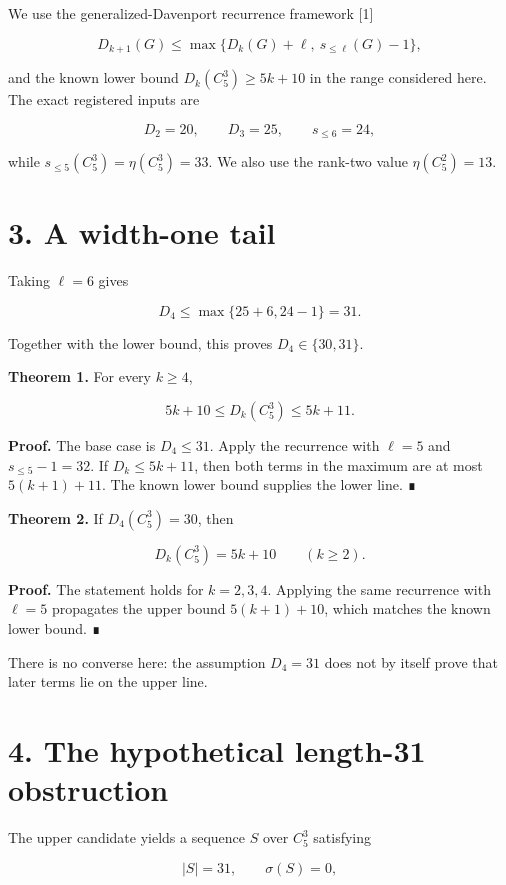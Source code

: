 \documentclass[
  11pt,
]{article}
\begin{document}
We use the generalized-Davenport recurrence framework {[}1{]}

\[
D_{k+1}(G)
\le\max\{D_k(G)+\ell, \ s_{\le\ell}(G)-1\},
\]

and the known lower bound \(D_k(C_5^3)\ge5k+10\) in the range considered
here. The exact registered inputs are

\[
D_2=20, \qquad D_3=25, \qquad s_{\le6}=24,
\]

while \(s_{\le5}(C_5^3)=\eta(C_5^3)=33\). We also use the rank-two value
\(\eta(C_5^2)=13\).

\hypertarget{a-width-one-tail}{%
\section{3. A width-one tail}\label{a-width-one-tail}}

Taking \(\ell=6\) gives

\[
D_4\le\max\{25+6,24-1\}=31.
\]

Together with the lower bound, this proves \(D_4\in\{30,31\}\).

\textbf{Theorem 1.} For every \(k\ge4\),

\[
5k+10\le D_k(C_5^3)\le5k+11.
\]

\textbf{Proof.} The base case is \(D_4\le31\). Apply the recurrence with
\(\ell=5\) and \(s_{\le5}-1=32\). If \(D_k\le5k+11\), then both terms in
the maximum are at most \(5(k+1)+11\). The known lower bound supplies
the lower line. ∎

\textbf{Theorem 2.} If \(D_4(C_5^3)=30\), then

\[
D_k(C_5^3)=5k+10
\qquad(k\ge2).
\]

\textbf{Proof.} The statement holds for \(k=2,3,4\). Applying the same
recurrence with \(\ell=5\) propagates the upper bound \(5(k+1)+10\),
which matches the known lower bound. ∎

There is no converse here: the assumption \(D_4=31\) does not by itself
prove that later terms lie on the upper line.

\hypertarget{the-hypothetical-length-31-obstruction}{%
\section{4. The hypothetical length-31
obstruction}\label{the-hypothetical-length-31-obstruction}}

The upper candidate yields a sequence \(S\) over \(C_5^3\) satisfying

\[
|S|=31, \qquad \sigma(S)=0,
\]
\end{document}
